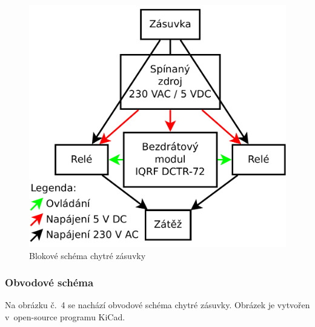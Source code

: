 \documentclass[12pt,a4paper,oneside]{article}
\begin{document}
\begin{figure}[H]
\centering
\label{fig:blokove-schema-zasuvky}
\includegraphics[width = 128mm]{img/blokove-schema/zasuvka.pdf}
\caption{Blokové schéma chytré zásuvky}
\end{figure}

\newpage

\subsubsection{Obvodové schéma}

Na obrázku č.~4 se nachází obvodové schéma chytré zásuvky. Obrázek je vytvořen v~open-source programu KiCad\cite{sw/kicad}.
\end{document}
